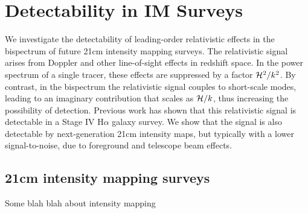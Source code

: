 \chapter{Detectability in IM Surveys}
\label{chapter:snrska}

We investigate the detectability of leading-order relativistic effects in the bispectrum of future 21cm intensity  mapping surveys. The relativistic signal arises from Doppler and other line-of-sight effects in redshift space. In the power spectrum of a single tracer, these effects are suppressed by a factor $\mathcal{H}^2/k^2$. By contrast, in the bispectrum the relativistic signal couples to short-scale modes, leading to
an imaginary contribution that scales as $\mathcal{H}/k$, thus increasing the possibility of detection.
Previous work has shown that this relativistic signal is detectable in a Stage IV H$\alpha$ galaxy survey. 
{We show that the signal is also detectable by next-generation  21cm intensity maps, but typically with a lower signal-to-noise, due to foreground and telescope beam effects.}
%
%
%
%
\section{21cm intensity mapping surveys}
%
Some blah blah about intensity mapping 
%
